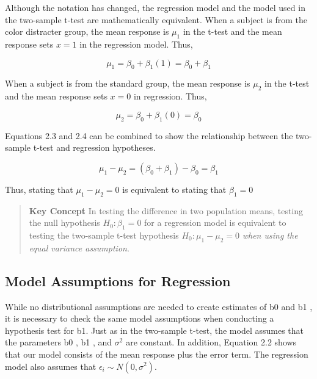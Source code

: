 \documentclass[
]{book}
\begin{document}
Although the notation has changed, the regression model and the model used in the two-sample t-test are mathematically equivalent. When a subject is from the color distracter group, the mean response is \(\mu_1\) in the t-test and the mean response sets \(x = 1\) in the regression model. Thus,

\begin{equation}
\label{2.3} 
\mu_1 = \beta_0 + \beta_1(1)  = \beta_0 + \beta_1 
\tag{2.3}
\end{equation}

When a subject is from the standard group, the mean response is \(\mu_2\) in the t-test and the mean response sets \(x = 0\) in regression. Thus,

\begin{equation}
\label{2.4} 
\mu_2 = \beta_0 + \beta_1(0)  = \beta_0 
\tag{2.4}
\end{equation}

Equations 2.3 and 2.4 can be combined to show the relationship between the two-sample t-test and regression hypotheses.

\begin{equation}
\label{2.5} 
\mu_1 - \mu_2 = (\beta_0 + \beta_1) -  \beta_0 = \beta_1 
\tag{2.5}
\end{equation}

Thus, stating that \(\mu_1 - \mu_2 = 0\) is equivalent to stating that \(\beta_1 = 0\)

\begin{quote}
\textbf{Key Concept}
In testing the difference in two population means, testing the null hypothesis \(H_0 : \beta_1 = 0\) for a regression model is equivalent to testing the two-sample t-test hypothesis \(H_0 : \mu_1 - \mu_2 = 0\) \emph{when using the equal variance assumption}.
\end{quote}

\hypertarget{model-assumptions-for-regression}{%
\subsection*{Model Assumptions for Regression}\label{model-assumptions-for-regression}}

While no distributional assumptions are needed to create estimates of b0 and b1 , it is necessary to check the same model assumptions when conducting a hypothesis test for b1. Just as in the two-sample t-test, the model assumes that the parameters b0 , b1 , and \(\sigma^2\) are constant. In addition, Equation 2.2 shows that our model consists of the mean response plus the error term. The regression model also assumes that \(\epsilon_i \sim N(0,\sigma^2)\).
\end{document}
